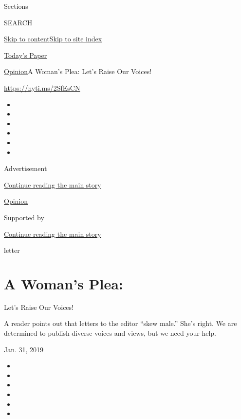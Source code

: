 Sections

SEARCH

\protect\hyperlink{site-content}{Skip to
content}\protect\hyperlink{site-index}{Skip to site index}

\href{https://myaccount.nytimes3xbfgragh.onion/auth/login?response_type=cookie\&client_id=vi}{}

\href{https://www.nytimes3xbfgragh.onion/section/todayspaper}{Today's
Paper}

\href{/section/opinion}{Opinion}\textbar{}A Woman's Plea: Let's Raise
Our Voices!

\href{https://nyti.ms/2SfEsCN}{https://nyti.ms/2SfEsCN}

\begin{itemize}
\item
\item
\item
\item
\item
\item
\end{itemize}

Advertisement

\protect\hyperlink{after-top}{Continue reading the main story}

\href{/section/opinion}{Opinion}

Supported by

\protect\hyperlink{after-sponsor}{Continue reading the main story}

letter

\hypertarget{a-womans-plea}{%
\section{A Woman's Plea:}\label{a-womans-plea}}

Let's Raise Our Voices!

A reader points out that letters to the editor ``skew male.'' She's
right. We are determined to publish diverse voices and views, but we
need your help.

Jan. 31, 2019

\begin{itemize}
\item
\item
\item
\item
\item
\item
\end{itemize}


